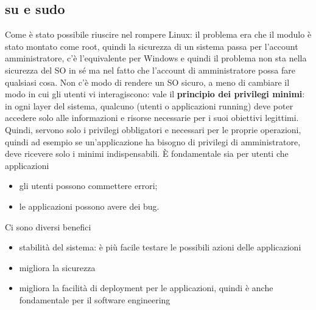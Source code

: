 \documentclass[12pt, oneside]{extbook} %
\begin{document}
\subsection{su e sudo}
Come è stato possibile riuscire nel rompere Linux: il problema era che il modulo è stato montato come root, quindi la sicurezza di un sistema passa per l'account amministratore, c'è l'equivalente per Windows e quindi il problema non sta nella sicurezza del SO in sé ma nel fatto che l'account di amministratore possa fare qualsiasi cosa. Non c'è modo di rendere un SO sicuro, a meno di cambiare il modo in cui gli utenti vi interagiscono: vale il \textbf{principio dei privilegi minimi}: in ogni layer del sistema, qualcuno (utenti o applicazioni running) deve poter accedere solo alle informazioni e risorse necessarie per i suoi obiettivi legittimi.\\Quindi, servono solo i privilegi obbligatori e necessari per le proprie operazioni, quindi ad esempio se un'applicazione ha bisogno di privilegi di amministratore, deve ricevere solo i minimi indispensabili. È fondamentale sia per utenti che applicazioni
\begin{itemize}
\item gli utenti possono commettere errori;
\item le applicazioni possono avere dei bug.
\end{itemize}
Ci sono diversi benefici
\begin{itemize}
\item stabilità del sistema: è più facile testare le possibili azioni delle applicazioni
\item migliora la sicurezza
\item migliora la facilità di deployment per le applicazioni, quindi è anche fondamentale per il software engineering
\end{itemize}
\end{document}
